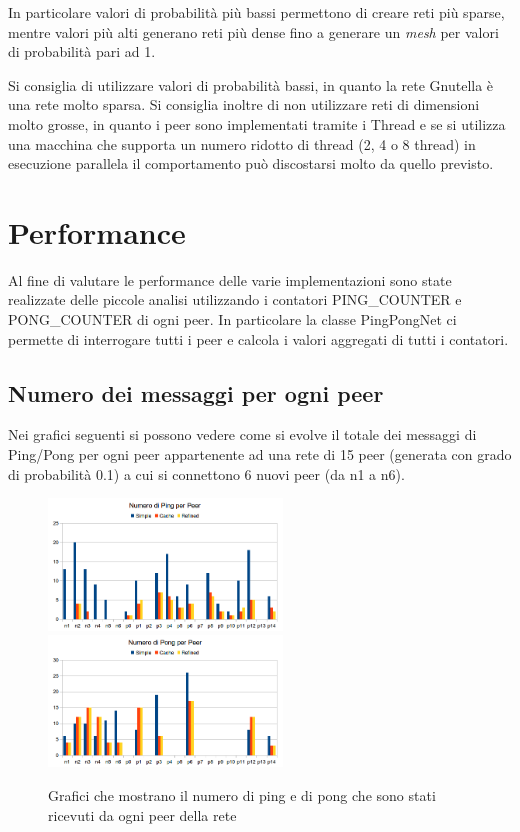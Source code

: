 \documentclass[a4paper,11pt]{article}
\begin{document}
In particolare valori di probabilit\`a pi\`u bassi permettono di creare reti pi\`u sparse, mentre valori pi\`u alti generano reti pi\`u dense fino a generare un \emph{mesh} per valori di probabilit\`a pari ad 1.

Si consiglia di utilizzare valori di probabilit\`a bassi, in quanto la rete Gnutella \`e una rete molto sparsa. Si consiglia inoltre di non utilizzare reti di dimensioni molto grosse, in quanto i peer sono implementati tramite i \textsf{Thread} e se si utilizza una macchina che supporta un numero ridotto di thread (2, 4 o 8 thread) in esecuzione parallela il comportamento pu\`o discostarsi molto da quello previsto.

\section{Performance}
\label{sec:performance}

Al fine di valutare le performance delle varie implementazioni sono state realizzate delle piccole analisi utilizzando i contatori \textsf{PING\_COUNTER} e \textsf{PONG\_COUNTER} di ogni peer. In particolare la classe \textsf{PingPongNet} ci permette di interrogare tutti i peer e calcola i valori aggregati di tutti i contatori.

\subsection{Numero dei messaggi per ogni peer}

Nei grafici seguenti si possono vedere come si evolve il totale dei messaggi di Ping/Pong per ogni peer appartenente ad una rete di 15 peer (generata con grado di probabilit\`a 0.1) a cui si connettono 6 nuovi peer (da \textsf{n1} a \textsf{n6}).

\begin{figure}[ht]
\centering
\includegraphics[height=3.5cm]{graph1ping.png}
\includegraphics[height=3.5cm]{graph1pong.png}
\caption{\small{Grafici che mostrano il numero di ping e di pong che sono stati ricevuti da ogni peer della rete}}
\label{fig:peer}
\end{figure}
\end{document}
